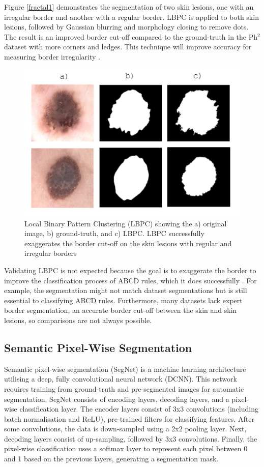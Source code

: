 \documentclass[10.5pt]{report}
\begin{document}
Figure \ref{fractal1} demonstrates the segmentation of two skin lesions, one with an irregular border and another with a regular border. LBPC is applied to both skin lesions, followed by Gaussian blurring and morphology closing to remove dots. The result is an improved border cut-off compared to the ground-truth in the Ph$^2$ dataset with more corners and ledges. This technique will improve accuracy for measuring border irregularity \cite{Pereira2020}.
 
\begin{figure}
\centering
\includegraphics[scale=1.2]{borders.PNG}
\caption{Local Binary Pattern Clustering (LBPC) showing the a) original image, b) ground-truth, and c) LBPC. LBPC successfully exaggerates the border cut-off on the skin lesions with regular and irregular borders} 
\end{figure} \label{fractal1}

Validating LBPC is not expected because the goal is to exaggerate the border to improve the classification process of ABCD rules, which it does successfully \cite{Pereira2020, Kaya2016}. For example, the segmentation might not match dataset segmentations but is still essential to classifying ABCD rules. Furthermore, many datasets lack expert border segmentation, an accurate border cut-off between the skin and skin lesions, so comparisons are not always possible.

\subsection{Semantic Pixel-Wise Segmentation}
Semantic pixel-wise segmentation (SegNet) is a machine learning architecture utilising a deep, fully convolutional neural network (DCNN). This network requires training from ground-truth and pre-segmented images for automatic segmentation. SegNet consists of encoding layers, decoding layers, and a pixel-wise classification layer. The encoder layers consist of 3x3 convolutions (including batch normalisation and ReLU), pre-trained filters for classifying features. After some convolutions, the data is down-sampled using a 2x2 pooling layer. Next, decoding layers consist of up-sampling, followed by 3x3 convolutions. Finally, the pixel-wise classification uses a softmax layer to represent each pixel between 0 and 1 based on the previous layers, generating a segmentation mask.
\end{document}
